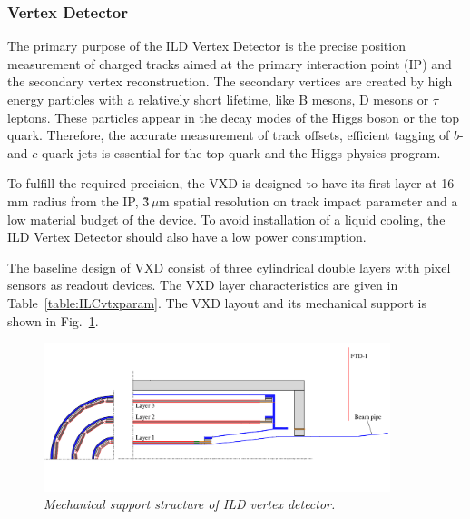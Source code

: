\subsubsection{Vertex Detector}
The primary purpose of the ILD Vertex Detector is the precise position measurement of charged tracks aimed at the primary interaction point (IP) and the secondary vertex reconstruction.
The secondary vertices are created by high energy particles with a relatively short lifetime, like B mesons, D mesons or $\tau$ leptons. These particles appear in the decay modes of the Higgs boson or the top quark. Therefore, the accurate measurement of track offsets, efficient tagging of $b$- and $c$-quark jets is essential for the top quark and the Higgs physics program. %

To fulfill the required precision, the VXD is designed to have its first layer at 16\,mm radius from the IP, \~3\,$\mu$m spatial resolution on track impact parameter and a low material budget of the device. To avoid installation of a liquid cooling, the ILD Vertex Detector should also have a low power consumption.

The baseline design of VXD consist of three cylindrical double layers with pixel sensors as readout devices. The VXD layer characteristics are given in Table~\ref{table:ILCvtxparam}.
The VXD layout and its mechanical support is shown in Fig.~\ref{fig:ILCvtxsupport}. 



\begin{figure}
\centering

    \includegraphics[width=0.9\textwidth]{graphics/ILCvtxsupport.png}
    \caption{\sl Mechanical support structure of ILD vertex detector.}
    \label{fig:ILCvtxsupport}


\end{figure}

